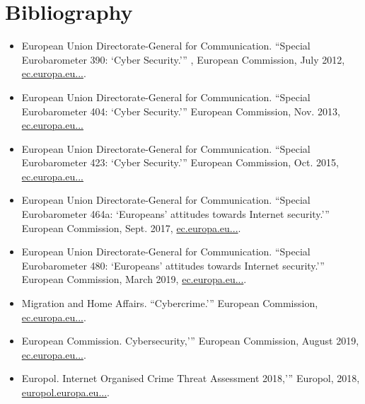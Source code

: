 \documentclass{article}
\begin{document}
{\color{EUblue}\section{Bibliography}}

\begin{itemize}
    \item European Union Directorate-General for Communication. “Special Eurobarometer 390: ‘Cyber Security.’” , European Commission, July 2012, \href{https://ec.europa.eu/commfrontoffice/publicopinion/index.cfm/Survey/getSurveyDetail/instruments/SPECIAL/surveyKy/1058}{ec.europa.eu...}.
    \item European Union Directorate-General for Communication. “Special Eurobarometer 404: ‘Cyber Security.’” European Commission, Nov. 2013, \href{https://ec.europa.eu/commfrontoffice/publicopinion/index.cfm/Survey/getSurveyDetail/instruments/SPECIAL/surveyKy/1073}{ec.europa.eu...}
    \item European Union Directorate-General for Communication. “Special Eurobarometer 423: ‘Cyber Security.’” European Commission, Oct. 2015, \href{https://ec.europa.eu/commfrontoffice/publicopinion/index.cfm/Survey/getSurveyDetail/instruments/SPECIAL/surveyKy/2019}{ec.europa.eu...}
    \item European Union Directorate-General for Communication. “Special Eurobarometer 464a: ‘Europeans’ attitudes towards Internet security.’” European Commission, Sept. 2017, \href{https://ec.europa.eu/commfrontoffice/publicopinion/index.cfm/Survey/getSurveyDetail/instruments/SPECIAL/surveyKy/2171}{ec.europa.eu...}.
    \item European Union Directorate-General for Communication. “Special Eurobarometer 480: ‘Europeans’ attitudes towards Internet security.’” European Commission, March 2019, \href{https://ec.europa.eu/commfrontoffice/publicopinion/index.cfm/survey/getsurveydetail/instruments/special/surveyky/2207}{ec.europa.eu...}.
    \item Migration and Home Affairs. “Cybercrime.’” European Commission, \href{https://ec.europa.eu/home-affairs/what-we-do/policies/cybercrime_en}{ec.europa.eu...}.
    \item European Commission. Cybersecurity,’” European Commission, August 2019, \href{https://ec.europa.eu/digital-single-market/en/cyber-security}{ec.europa.eu...}.
    \item Europol. Internet Organised Crime Threat Assessment 2018,’” Europol, 2018, \href{https://www.europol.europa.eu/internet-organised-crime-threat-assessment-2018}{europol.europa.eu...}.
\end{itemize}
\end{document}
